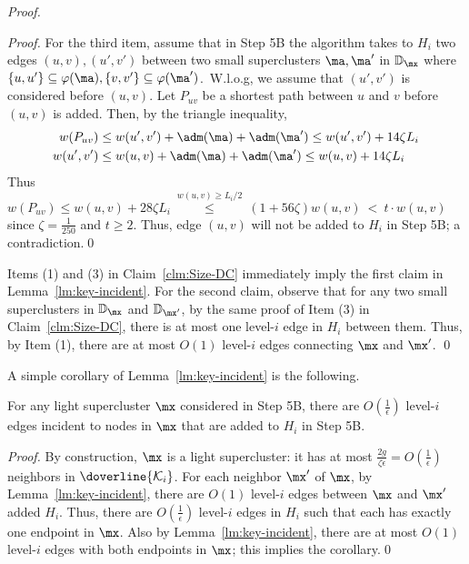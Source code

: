 \begin{proof}
\begin{proof}
		For the third item, assume that  in Step 5B the algorithm takes to $H_i$ two edges $(u,v), (u',v')$ between two small superclusters $\ma,\ma'$ in $\mathbb{D}_\mx$ where $\{u,u'\}\subseteq \varphi(\ma),  \{v,v'\}\subseteq \varphi(\ma')$.~W.l.o.g, we assume that $(u',v')$ is considered before $(u,v)$. Let $P_{uv}$ be a shortest path between $u$ and $v$ before $(u,v)$ is added.  Then, by the triangle inequality,
		\begin{equation}
		\begin{split}
		w(P_{uv})&\leq w(u',v') + \adm(\ma) + \adm(\ma') \leq  w(u',v') + 14\zeta L_i \\
		w(u',v')&\leq w(u,v) + \adm(\ma) + \adm(\ma') \leq  w(u,v) + 14\zeta L_i
		\end{split}
		\end{equation}
		Thus  $w(P_{uv}) \leq w(u,v) + 28\zeta L_i ~\stackrel{w(u,v)\geq L_i/2}{\leq}~ (1+56\zeta) w(u,v)  ~<~ t\cdot w(u,v)$ since $\zeta = \frac{1}{250}$ and $t\geq 2$. Thus, edge $(u,v)$ will not be added to $H_i$ in Step 5B;  a contradiction.\qed
	\end{proof}
	Items (1) and (3) in Claim~\ref{clm:Size-DC} immediately imply the first claim in Lemma~\ref{lm:key-incident}.  For the second claim, observe that for any two small superclusters in $\mathbb{D}_\mx$ and $\mathbb{D}_{\mx'}$, by the same proof of Item (3) in Claim~\ref{clm:Size-DC}, there is at most one level-$i$ edge in $H_i$ between them. Thus, by Item (1), there are at most $O(1)$ level-$i$ edges connecting $\mx$ and $\mx'$.
	\qed
\end{proof}

A simple corollary of Lemma~\ref{lm:key-incident} is the following.

\begin{corollary}\label{cor:deg-C-5B}
	For any light supercluster $\mx$ considered in  Step 5B, there are $O(\frac{1}{\epsilon})$ level-$i$ edges incident to nodes in $\mx$ that are added to $H_i$ in Step 5B.
\end{corollary}
\begin{proof}
	By construction, $\mx$ is a light supercluster: it has at most $\frac{2g}{\zeta\epsilon} = O(\frac{1}{\epsilon})$ neighbors in $\doverline{\mathcal{K}_i}$.  For each neighbor $\mx'$ of $\mx$, by Lemma~\ref{lm:key-incident}, there are $O(1)$ level-$i$ edges between $\mx$ and $\mx'$ added $H_i$. Thus, there are $O(\frac{1}{\epsilon})$ level-$i$ edges in $H_i$ such that each has exactly one endpoint in $\mx$. Also by Lemma~\ref{lm:key-incident}, there are at most $O(1)$ level-$i$ edges with both endpoints in $\mx$; this implies the corollary.\qed
\end{proof}

